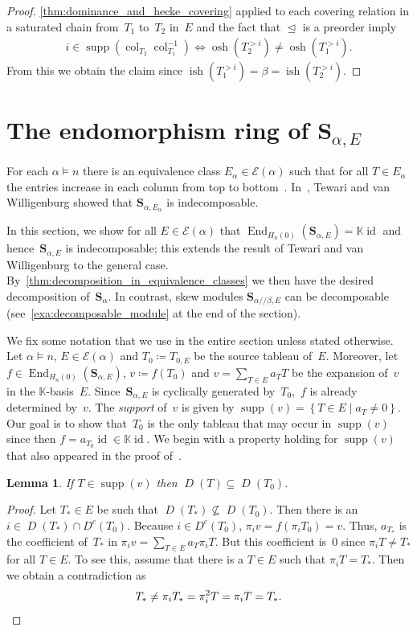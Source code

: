 \documentclass[10pt]{amsart}
\theoremstyle{plain}
\theoremstyle{plain}
\newtheorem{lemma}[lemma]{Lemma}
\theoremstyle{plain}
\theoremstyle{plain}
\theoremstyle{plain}
\theoremstyle{definition}
\theoremstyle{definition}
\newcommand{\bs}[1]{\boldsymbol{#1} }
\newcommand{\mc}[1]{\mathcal{#1} }
\newcommand{\K}{\mathbb K}
\newcommand{\D}{\operatorname{\mathit{D}}}
\newcommand{\DC}{\operatorname{\mathit{D^c}}}
\DeclareMathOperator{\id}{id}
\DeclareMathOperator{\osh}{osh}
\DeclareMathOperator{\ish}{ish}
\DeclareMathOperator{\supp}{supp}
\DeclareMathOperator{\End}{End}
\newcommand{\set}[1]{\left\{ #1 \right\}}
\newcommand{\col}{\operatorname{col}}
\newcommand{\He}{H_n(0)}
\newcommand{\ab}{{\alpha / \! \! / \beta}}
\newcommand{\dleq}{\trianglelefteq}
\newcommand{\sa}{\bs S_{\alpha}}
\newcommand{\se}{\bs S_{\alpha,E}}
\newcommand{\sse}{\bs S_{\ab,E}}
\begin{document}
\begin{proof}	 
	\cref{thm:dominance_and_hecke_covering} applied to each covering relation in a saturated chain from~$T_1$ to~$T_2$ in~$E$ and the fact that $\dleq$ is a preorder imply 
	\begin{align*}
		i\in \supp(\col_{T_2}\col^{-1}_{T_1}) \iff \osh(T_2^{>i}) \neq \osh(T_1^{>i}).
	\end{align*}
	From this we obtain the claim since $\ish(T^{>i}_1) = \beta = \ish(T^{>i}_2)$.
\end{proof}

\section{The endomorphism ring of \texorpdfstring{$\bs S_{\alpha,E}$}{S\_a,E}}
\label{sec:endomorphism_ring_of_0-Hecke_modules}

 For each $\alpha \vDash n$ there is an equivalence class $E_\alpha\in \mc E(\alpha)$ such that for all $T \in E_\alpha$ the entries increase in each column from top to bottom~\cite[Section~8]{Tewari2015}. 
In~\cite{Tewari2015}, Tewari and van Willigenburg showed that $\bs S_{\alpha,E_\alpha}$ is indecomposable.

In this section, we show for all $E\in \mc E(\alpha)$ that $\End_{\He}(\se) = \K\id$ and hence~$\se$ is indecomposable; this extends the result of Tewari and van Willigenburg to the general case.
By~\cref{thm:decomposition_in_equivalence_classes} we then have the desired decomposition of~$\sa$.
In contrast, skew modules $\sse$ can be decomposable (see~\cref{exa:decomposable_module} at the end of the section).

We fix some notation that we use in the entire section unless stated otherwise.
Let $\alpha\vDash n$, $E\in \mc E(\alpha)$ and $T_0 \coloneqq T_{0,E}$ be the source tableau of~$E$.
Moreover, let $f\in \End_{\He}(\se)$, $v\coloneqq f(T_0)$ and $v = \sum_{T\in E} a_T T$ be the expansion of~$v$ in the $\K$-basis~$E$.
Since~$\se$ is cyclically generated by~$T_0$,~$f$ is already determined by~$v$.
The \emph{support} of~$v$ is given by $\supp(v)=\set{T\in E \mid a_T \neq 0}$.
Our goal is to show that~$T_0$ is the only tableau that may occur in $\supp(v)$ since then $f = a_{T_0} \id \in \K\id$.
We begin with a property holding for $\supp(v)$ that also appeared in the proof of~\cite[Theorem~7.8]{Tewari2015}.

\begin{lemma}
	\label{thm:descent_set_of_support_of_v}
	If $T\in \supp(v)$ then $\D(T) \subseteq \D(T_0)$.
\end{lemma}
\begin{proof} Let $T_*\in E$ be such that $\D(T_*)\not \subseteq \D(T_0)$. 
	Then there is an $i\in \D(T_*)\cap \DC(T_0)$. 
	 Because $i\in \DC(T_0)$, $\pi_i v = f(\pi_i T_0) = v$. Thus, $a_{T_*}$ is the coefficient of~$T_*$ in $\pi_i v = \sum_{T \in E} a_T \pi_i T$. But this coefficient is~$0$ since $\pi_iT \neq T_*$ for all $T\in E$. To see this, assume that there is a $T\in E$ such that $\pi_i T = T_*$. Then we obtain a contradiction as
	 \[
	 T_* \neq \pi_i T_* = \pi_i^2 T = \pi_i T = T_*. \qedhere
	 \]	
\end{proof}
\end{document}
